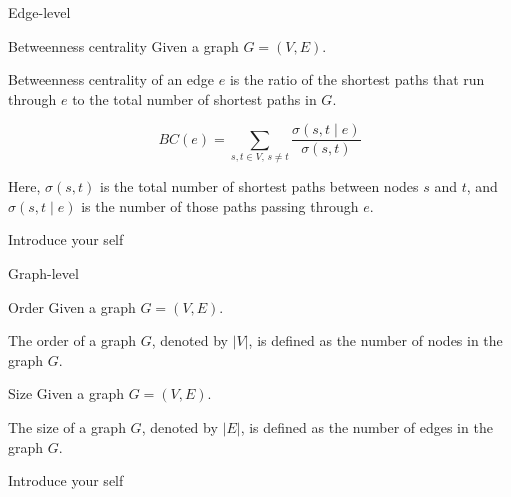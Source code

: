 \documentclass[aspectratio=169]{beamer}
\begin{document}
    \begin{frame}{Edge-level}
        \begin{exampleblock}{Betweenness centrality}
            Given a graph $G = (V, E)$.
            
            Betweenness centrality of an edge $e$ is the ratio of the shortest paths that run through $e$ to the total number of shortest paths in $G$.
        \end{exampleblock}

        \begin{equation}
            BC(e) = {\sum_{s, t \in V ,\, s \neq t} \frac{\sigma(s, t \mid e)}{\sigma(s, t)}}
        \end{equation}

        Here, $\sigma(s, t)$ is the total number of shortest paths between nodes $s$ and $t$, and $\sigma(s, t \mid e)$ is the number of those paths passing through $e$. \newline
        

        \begin{note}
            {Introduce your self}
        \end{note}
    \end{frame}

    \begin{frame}{Graph-level}
        \begin{exampleblock}{Order}
            Given a graph $G = (V, E)$.
            
            The order of a graph $G$, denoted by $|V|$, is defined as the number of nodes in the graph $G$.
        \end{exampleblock}

        \begin{exampleblock}{Size}
            Given a graph $G = (V, E)$.
            
            The size of a graph $G$, denoted by $|E|$, is defined as the number of edges in the graph $G$.
        \end{exampleblock}

        \begin{note}
            {Introduce your self}
        \end{note}
    \end{frame}
\end{document}
